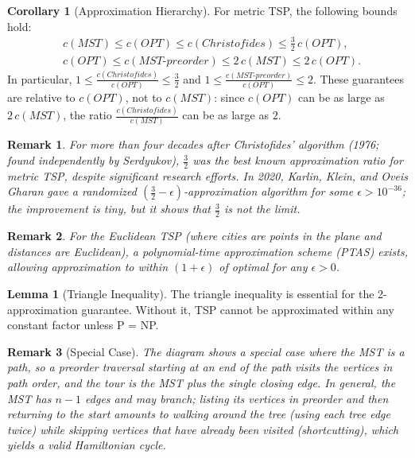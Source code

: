 \documentclass{article}
\newtheorem{remark}{Remark}
\theoremstyle{definition}
\newtheorem{lemma}{Lemma}
\newtheorem{corollary}{Corollary}
\begin{document}
\begin{corollary}[Approximation Hierarchy]
For metric TSP, the following bounds hold:
\begin{align}
&c(MST) \leq c(OPT) \leq c(Christofides) \leq \tfrac{3}{2}\, c(OPT),\\
&c(OPT) \leq c(MST\text{-}preorder) \leq 2\, c(MST) \leq 2\, c(OPT).
\end{align}
In particular, $1 \leq \frac{c(Christofides)}{c(OPT)} \leq \frac{3}{2}$ and $1 \leq \frac{c(MST\text{-}preorder)}{c(OPT)} \leq 2$. These guarantees are relative to $c(OPT)$, not to $c(MST)$: since $c(OPT)$ can be as large as $2\, c(MST)$, the ratio $\frac{c(Christofides)}{c(MST)}$ can be as large as $2$.
\end{corollary}

\begin{remark}
For more than four decades after Christofides' algorithm (1976; found independently by Serdyukov), $\frac{3}{2}$ was the best known approximation ratio for metric TSP, despite significant research efforts. In 2020, Karlin, Klein, and Oveis Gharan gave a randomized $(\frac{3}{2} - \epsilon)$-approximation algorithm for some $\epsilon > 10^{-36}$; the improvement is tiny, but it shows that $\frac{3}{2}$ is not the limit.
\end{remark}

\begin{remark}
For the Euclidean TSP (where cities are points in the plane and distances are Euclidean), a polynomial-time approximation scheme (PTAS) exists, allowing approximation to within $(1+\epsilon)$ of optimal for any $\epsilon > 0$.
\end{remark}

\begin{lemma}[Triangle Inequality]
The triangle inequality is essential for the 2-approximation guarantee. Without it, TSP cannot be approximated within any constant factor unless P = NP.
\end{lemma}

\begin{remark}[Special Case]
The diagram shows a special case where the MST is a path, so a preorder traversal starting at an end of the path visits the vertices in path order, and the tour is the MST plus the single closing edge. In general, the MST has $n-1$ edges and may branch; listing its vertices in preorder and then returning to the start amounts to walking around the tree (using each tree edge twice) while skipping vertices that have already been visited (shortcutting), which yields a valid Hamiltonian cycle.
\end{remark}
\end{document}
